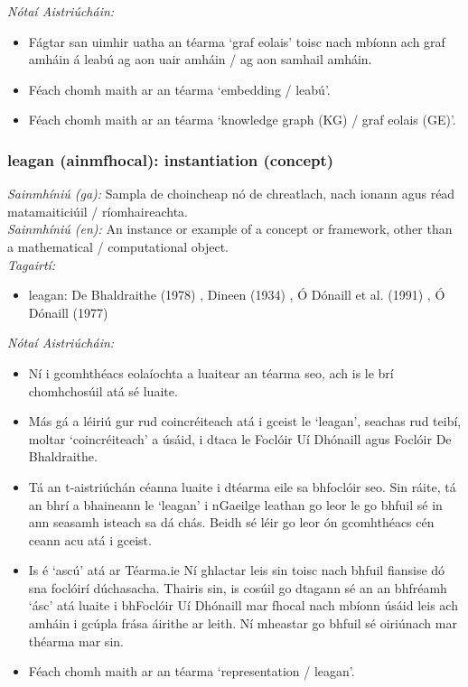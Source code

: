 \documentclass{article}
\begin{document}
 \noindent \textit{Nótaí Aistriúcháin:}
\begin{itemize}
	\item Fágtar san uimhir uatha an téarma `graf eolais' toisc nach mbíonn ach graf amháin á leabú ag aon uair amháin / ag aon samhail amháin.
	\item Féach chomh maith ar an téarma `embedding / leabú'.
	\item Féach chomh maith ar an téarma `knowledge graph (KG) / graf eolais (GE)'.
\end{itemize}


\subsubsection*{leagan (ainmfhocal): instantiation (concept)}
 \noindent \textit{Sainmhíniú (ga):} Sampla de choincheap nó de chreatlach, nach ionann agus réad matamaiticiúil / ríomhaireachta.
\\
 \noindent \textit{Sainmhíniú (en):} An instance or example of a concept or framework, other than a mathematical / computational object.
\\
 \noindent \textit{Tagairtí:}
\begin{itemize}
	\item leagan: De Bhaldraithe (1978) \cite{de-bhaldraithe}, Dineen (1934) \cite{dineen}, Ó Dónaill et al. (1991) \cite{focloir-beag}, Ó Dónaill (1977) \cite{odonaill}
\end{itemize}

 \noindent \textit{Nótaí Aistriúcháin:}
\begin{itemize}
	\item Ní i gcomhthéacs eolaíochta a luaitear an téarma seo, ach is le brí chomhchosúil atá sé luaite.
	\item Más gá a léiriú gur rud coincréiteach atá i gceist le `leagan', seachas rud teibí, moltar `coincréiteach' a úsáid, i dtaca le Foclóir Uí Dhónaill agus Foclóir De Bhaldraithe.
	\item Tá an t-aistriúchán céanna luaite i dtéarma eile sa bhfoclóir seo. Sin ráite, tá an bhrí a bhaineann le `leagan' i nGaeilge leathan go leor le go bhfuil sé in ann seasamh isteach sa dá chás. Beidh sé léir go leor ón gcomhthéacs cén ceann acu atá i gceist.
	\item Is é `ascú' atá ar Téarma.ie Ní ghlactar leis sin toisc nach bhfuil fiansise dó sna foclóirí dúchasacha. Thairis sin, is cosúil go dtagann sé an an bhfréamh `ásc' atá luaite i bhFoclóir Uí Dhónaill mar fhocal nach mbíonn úsáid leis ach amháin i gcúpla frása áirithe ar leith. Ní mheastar go bhfuil sé  oiriúnach mar théarma mar sin.
	\item Féach chomh maith ar an téarma `representation / leagan'.
\end{itemize}
\end{document}
